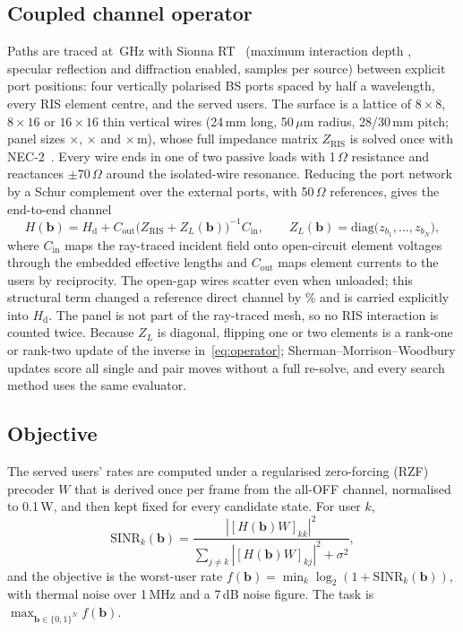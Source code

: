 \documentclass[runningheads]{llncs}
\newcommand{\Hd}{H_{\mathrm{d}}}
\begin{document}
\subsection{Coupled channel operator}
Paths are traced at \,GHz with Sionna RT~\cite{hoydis2023sionna} (maximum interaction depth , specular reflection and diffraction enabled,  samples per source) between explicit port positions: four vertically polarised BS ports spaced by half a wavelength, every RIS element centre, and the served users. The surface is a lattice of $8\times8$, $8\times16$ or $16\times16$ thin vertical wires (24\,mm long, 50\,$\mu$m radius, 28/30\,mm pitch; panel sizes $\times$, $\times$ and $\times$\,m), whose full impedance matrix $Z_{\mathrm{RIS}}$ is solved once with NEC-2~\cite{burke1981nec,pynec}. Every wire ends in one of two passive loads with 1\,$\Omega$ resistance and reactances $\pm70\,\Omega$ around the isolated-wire resonance. Reducing the port network by a Schur complement over the external ports, with 50\,$\Omega$ references, gives the end-to-end channel
\begin{equation}
H(\mathbf b)=\Hd + C_{\mathrm{out}}\bigl(Z_{\mathrm{RIS}}+Z_L(\mathbf b)\bigr)^{-1}C_{\mathrm{in}},\qquad Z_L(\mathbf b)=\mathrm{diag}\bigl(z_{b_1},\dots,z_{b_N}\bigr),
\label{eq:operator}
\end{equation}
where $C_{\mathrm{in}}$ maps the ray-traced incident field onto open-circuit element voltages through the embedded effective lengths and $C_{\mathrm{out}}$ maps element currents to the users by reciprocity. The open-gap wires scatter even when unloaded; this structural term changed a reference direct channel by \% and is carried explicitly into $\Hd$. The panel is not part of the ray-traced mesh, so no RIS interaction is counted twice. Because $Z_L$ is diagonal, flipping one or two elements is a rank-one or rank-two update of the inverse in~\eqref{eq:operator}; Sherman--Morrison--Woodbury updates score all single and pair moves without a full re-solve, and every search method uses the same evaluator.

\subsection{Objective}
The served users' rates are computed under a regularised zero-forcing (RZF) precoder $W$ that is derived once per frame from the all-OFF channel, normalised to 0.1\,W, and then kept fixed for every candidate state. For user $k$,
\begin{equation}
\mathrm{SINR}_k(\mathbf b)=\frac{|[H(\mathbf b)W]_{kk}|^2}{\sum_{j\neq k}|[H(\mathbf b)W]_{kj}|^2+\sigma^2},
\end{equation}
and the objective is the worst-user rate $f(\mathbf b)=\min_k\log_2(1+\mathrm{SINR}_k(\mathbf b))$, with thermal noise over 1\,MHz and a 7\,dB noise figure. The task is $\max_{\mathbf b\in\{0,1\}^N} f(\mathbf b)$.
\end{document}

